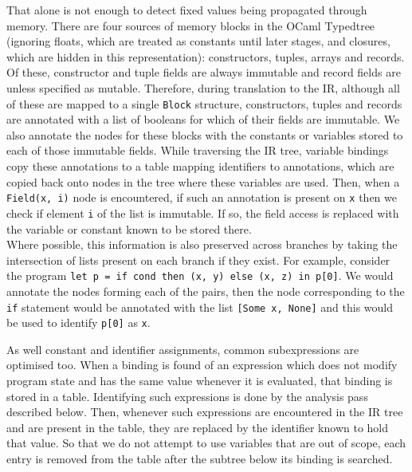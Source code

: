 That alone is not enough to detect fixed values being propagated through memory. There are four sources of memory blocks in the OCaml Typedtree (ignoring floats, which are treated as constants until later stages, and closures, which are hidden in this representation): constructors, tuples, arrays and records. Of these, constructor and tuple fields are always immutable and record fields are unless specified as mutable. Therefore, during translation to the IR, although all of these are mapped to a single \verb|Block| structure, constructors, tuples and records are annotated with a list of booleans for which of their fields are immutable. We also annotate the nodes for these blocks with the constants or variables stored to each of those immutable fields. 
While traversing the IR tree, variable bindings copy these annotations to a table mapping identifiers to annotations, which are copied back onto nodes in the tree where these variables are used. Then, when a \verb|Field(x, i)| node is encountered, if such an annotation is present on \verb|x| then we check if element \verb|i| of the list is immutable. If so, the field access is replaced with the variable or constant known to be stored there. \\
Where possible, this information is also preserved across branches by taking the intersection of lists present on each branch if they exist. For example, consider the program \verb|let p = if cond then (x, y) else (x, z) in p[0]|. We would annotate the nodes forming each of the pairs, then the node corresponding to the \verb|if| statement would be annotated with the list \verb|[Some x, None]| and this would be used to identify \verb|p[0]| as \verb|x|.

As well constant and identifier assignments, common subexpressions are optimised too. When a binding is found of an expression which does not modify program state and has the same value whenever it is evaluated, that binding is stored in a table. Identifying such expressions is done by the analysis pass described below. Then, whenever such expressions are encountered in the IR tree and are present in the table, they are replaced by the identifier known to hold that value. So that we do not attempt to use variables that are out of scope, each entry is removed from the table after the subtree below its binding is searched.

